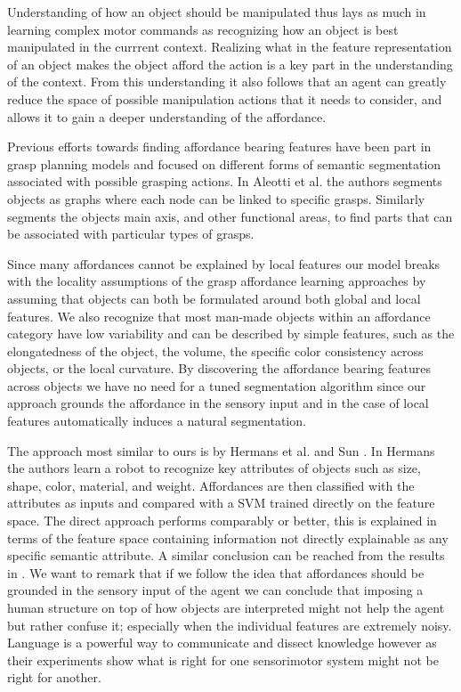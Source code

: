 Understanding of how an object should be manipulated thus lays as much
in learning complex motor commands as recognizing how an object is best
manipulated in the currrent context. Realizing what in the feature
representation of an object makes the object afford the action is a key
part in the understanding of the context. From this understanding it
also follows that an agent can greatly reduce the space of possible
manipulation actions that it needs to consider, and allows it to gain a
deeper understanding of the affordance.

Previous efforts towards finding affordance bearing features have been
part in grasp planning models and focused on different forms of semantic
segmentation associated with possible grasping actions. In Aleotti et
al. \cite{Aleotti:2011hc} the authors segments objects as graphs where
each node can be linked to specific grasps. Similarly
\cite{Faria:2014ug, Hjelm:2014uc, Antanas:2014uo} segments the objects
main axis, and other functional areas, to find parts that can be
associated with particular types of grasps.

Since many affordances cannot be explained by local features our model
breaks with the locality assumptions of the grasp affordance learning
approaches by assuming that objects can both be formulated around both
global and local features. We also recognize that most man-made objects
within an affordance category have low variability and can be described
by simple features, such as the elongatedness of the object, the volume,
the specific color consistency across objects, or the local curvature.
By discovering the affordance bearing features across objects we have no
need for a tuned segmentation algorithm since our approach grounds the
affordance in the sensory input and in the case of local features
automatically induces a natural segmentation.

The approach most similar to ours is by Hermans et al.
\cite{Hermans:2011vz} and Sun \cite{JieSun:2010kv}. In Hermans the
authors learn a robot to recognize key attributes of objects such as
size, shape, color, material, and weight. Affordances are then
classified with the attributes as inputs and compared with a SVM trained
directly on the feature space. The direct approach performs comparably
or better, this is explained in terms of the feature space containing
information not directly explainable as any specific semantic attribute.
A similar conclusion can be reached from the results in
\cite{JieSun:2010kv}. We want to remark that if we follow the idea that
affordances should be grounded in the sensory input of the agent we can
conclude that imposing a human structure on top of how objects are
interpreted might not help the agent but rather confuse it; especially
when the individual features are extremely noisy. Language is a powerful
way to communicate and dissect knowledge however as their experiments
show what is right for one sensorimotor system might not be right for
another.

